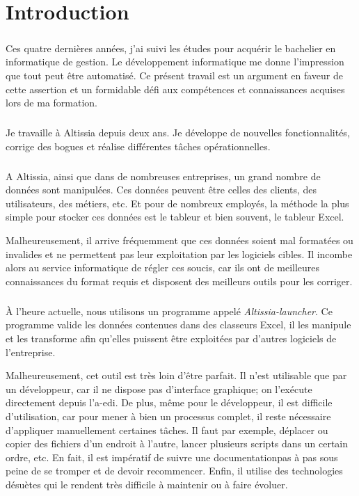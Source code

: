 \chapter{Introduction}
\label{ch:introduction}

\paragraph{}
Ces quatre dernières années, j'ai suivi les études pour acquérir le bachelier en informatique de gestion.
Le développement informatique me donne l'impression que tout peut être automatisé.
Ce présent travail est un argument en faveur de cette assertion et un formidable défi aux compétences et connaissances acquises lors de ma formation.

\paragraph{}
Je travaille à Altissia depuis deux ans.
Je développe de nouvelles fonctionnalités, corrige des bogues et réalise différentes tâches opérationnelles.

\paragraph{}
A Altissia, ainsi que dans de nombreuses entreprises, un grand nombre de données sont manipulées.
Ces données peuvent être celles des clients, des utilisateurs, des métiers, etc.
Et pour de nombreux employés, la méthode la plus simple pour stocker ces données est le tableur et bien souvent, le tableur Excel.

Malheureusement, il arrive fréquemment que ces données soient mal formatées ou invalides et ne permettent pas leur exploitation par les logiciels cibles.
Il incombe alors au service informatique de régler ces soucis, car ils ont de meilleures connaissances du format requis et disposent des meilleurs outils pour les corriger.

\paragraph{}
À l'heure actuelle, nous utilisons un programme appelé \textit{Altissia-launcher}.
Ce programme valide les données contenues dans des classeurs Excel, il les manipule et les transforme afin qu'elles puissent être exploitées par d'autres logiciels de l'entreprise.

Malheureusement, cet outil est très loin d'être parfait.
Il n'est utilisable que par un développeur, car il ne dispose pas d'interface graphique; on l'exécute directement depuis l'\gls{a-edi}.
De plus, même pour le développeur, il est difficile d'utilisation, car pour mener à bien un processus complet, il reste nécessaire d'appliquer manuellement certaines tâches.
Il faut par exemple, déplacer ou copier des fichiers d'un endroit à l'autre, lancer plusieurs scripts dans un certain ordre, etc.
En fait, il est impératif de suivre une documentation\fnmark pas à pas sous peine de se tromper et de devoir recommencer.
Enfin, il utilise des technologies désuètes qui le rendent très difficile à maintenir ou à faire évoluer.


